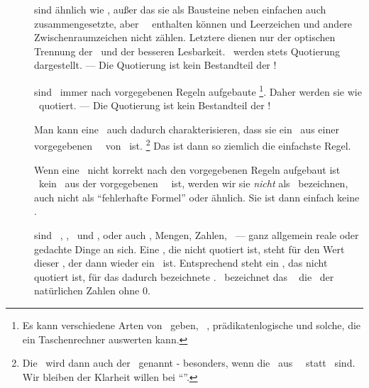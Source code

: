 \begin{description}
	\item [\Symbolfolgen] sind ähnlich wie \Zeichenketten, außer das sie als Bausteine neben einfachen auch zusammengesetzte, aber \atomare\ \Symbole\ enthalten können und Leerzeichen und andere Zwischenraumzeichen nicht zählen.
	Letztere dienen nur der optischen Trennung der \Symbole\ und der besseren Lesbarkeit.
	\Symbolfolgen\ werden stets  Quotierung dargestellt.
	--- Die Quotierung ist kein Bestandteil der \Symbolfolge!

	\item [\Formeln] \label{def:Formel} sind \hier\ immer nach vorgegebenen Regeln aufgebaute \Symbolfolgen%
	\footnote{%
		Es kann verschiedene Arten von \Formeln\ geben, \textzB\ \aussagenlogischeF, prädikatenlogische und solche, die ein Taschenrechner auswerten kann.
	}.
	Daher werden sie wie \Symbolfolgen\ quotiert.
	--- Die Quotierung ist kein Bestandteil der \Symbolfolge!

	Man kann eine \Formel\ auch dadurch charakterisieren, dass sie ein \Element\ aus einer vorgegebenen \Menge\ \MtsSprache\ von \Symbolfolgen\ ist.%
	\footnote{%
		Die \Formel\ wird dann auch  der  \MtsSprache\ genannt - besonders, wenn die \Elemente\ aus \MtsSprache\ \Zeichenketten\ statt \Symbolfolgen\ sind.
		Wir bleiben der Klarheit willen bei "`\Formel"'.
	}
	Das ist dann so ziemlich die einfachste Regel.

	Wenn eine \Symbolfolge\ nicht korrekt nach den vorgegebenen Regeln aufgebaut ist \textbzw\ kein \Element\ aus der vorgegebenen \Menge\ \MtsSprache\ ist, werden wir sie \emph{nicht} als \Formel\ bezeichnen, auch nicht als "`fehlerhafte Formel"' oder ähnlich.
	Sie ist dann einfach keine \Formel.

	\item [\Objekte] sind \textzB\ \Symbole, \Zeichenketten, \Symbolfolgen\ und \Formeln, oder auch \Aussagen, Mengen, Zahlen, \textusw\ --- ganz allgemein reale oder gedachte Dinge an sich.
	Eine \Formel, die nicht quotiert ist, steht für den Wert dieser \Formel, der dann wieder ein \Objekt\ ist.
	Entsprechend steht ein \Symbol, das nicht quotiert ist, für das dadurch bezeichnete \Objekt.
	\textZB\ bezeichnet das \Symbol\ \chrqt{\MtsIN} die \Menge\ \MtsIN der natürlichen Zahlen ohne 0.

\end{description}

